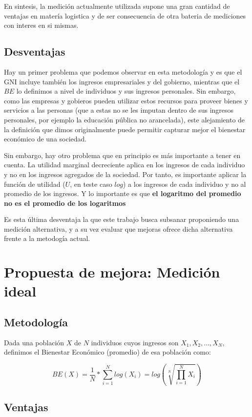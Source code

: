 En sintesis, la medición actualmente utilizada supone una gran cantidad de ventajas en matería logistica y de ser consecuencia de otra bateria de mediciones con interes en si mismas.

\subsection{Desventajas}

Hay un primer problema que podemos observar en esta metodología y es que el GNI incluye también los ingresos empresariales y del gobierno, mientras que el $BE$ lo definimos a nivel de individuos y sus ingresos personales. Sin embargo, como las empresas y gobieros pueden utilizar estos recursos para proveer bienes y servicios a las personas (que a estas no se les imputan dentro de sus ingresos personales, por ejemplo la educación pública no arancelada), este alejamiento de la definición que dimos originalmente puede permitir capturar mejor el bienestar económico de una sociedad. 

Sin embargo, hay otro problema que en principio es más importante a tener en cuenta. La utilidad marginal decreciente aplica en los ingresos de cada individuo y no en los ingresos agregados de la sociedad. Por tanto, es importante aplicar la función de utilidad ($U$, en teste caso $log$) a los ingresos de cada individuo y no al promedio de los ingresos. Y lo importante es que \textbf{el logaritmo del promedio no es el promedio de los logaritmos}

Es esta última desventaja la que este trabajo busca subsanar proponiendo una medición alternativa, y a su vez evaluar que mejoras ofrece dicha alternativa frente a la metodogía actual.

\section{Propuesta de mejora: Medición ideal}

\subsection{Metodología}

Dada una población $X$ de $N$ individuos cuyos ingresos son $X_1, X_2, \dots, X_N$, definimos el Bienestar Económico (promedio) de esa población como:

$$
    BE(X) = \frac{1}{N} * \sum_{i=1}^N log(X_i) = log(\sqrt[N]{\prod_{i=1}^N X_i})
$$

\subsection{Ventajas}

